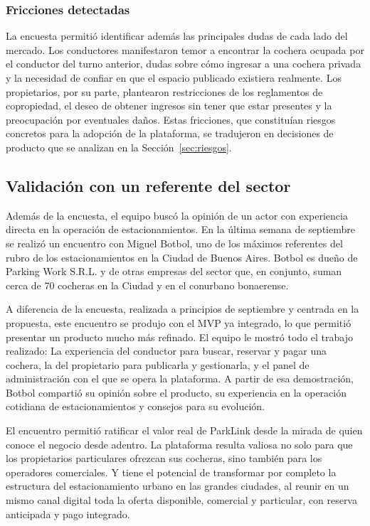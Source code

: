 \subsubsection{Fricciones detectadas}

La encuesta permitió identificar además las principales dudas de cada lado del mercado. Los conductores manifestaron temor a encontrar la cochera ocupada por el conductor del turno anterior, dudas sobre cómo ingresar a una cochera privada y la necesidad de confiar en que el espacio publicado existiera realmente. Los propietarios, por su parte, plantearon restricciones de los reglamentos de copropiedad, el deseo de obtener ingresos sin tener que estar presentes y la preocupación por eventuales daños. Estas fricciones, que constituían riesgos concretos para la adopción de la plataforma, se tradujeron en decisiones de producto que se analizan en la Sección~\ref{sec:riesgos}.

\subsection{Validación con un referente del sector}\label{sec:botbol}

Además de la encuesta, el equipo buscó la opinión de un actor con experiencia directa en la operación de estacionamientos. En la última semana de septiembre se realizó un encuentro con Miguel Botbol, uno de los máximos referentes del rubro de los estacionamientos en la Ciudad de Buenos Aires. Botbol es dueño de Parking Work S.R.L. y de otras empresas del sector que, en conjunto, suman cerca de 70 cocheras en la Ciudad y en el conurbano bonaerense.

A diferencia de la encuesta, realizada a principios de septiembre y centrada en la propuesta, este encuentro se produjo con el MVP ya integrado, lo que permitió presentar un producto mucho más refinado. El equipo le mostró todo el trabajo realizado: La experiencia del conductor para buscar, reservar y pagar una cochera, la del propietario para publicarla y gestionarla, y el panel de administración con el que se opera la plataforma. A partir de esa demostración, Botbol compartió su opinión sobre el producto, su experiencia en la operación cotidiana de estacionamientos y consejos para su evolución.

El encuentro permitió ratificar el valor real de ParkLink desde la mirada de quien conoce el negocio desde adentro. La plataforma resulta valiosa no solo para que los propietarios particulares ofrezcan sus cocheras, sino también para los operadores comerciales. Y tiene el potencial de transformar por completo la estructura del estacionamiento urbano en las grandes ciudades, al reunir en un mismo canal digital toda la oferta disponible, comercial y particular, con reserva anticipada y pago integrado.

